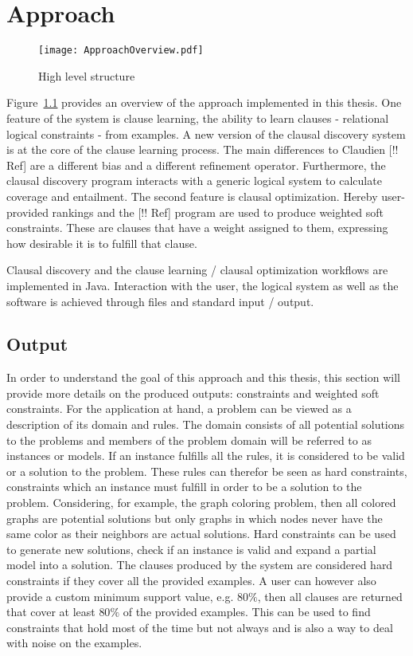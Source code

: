 \chapter{Approach}
\label{cha:meth}

\begin{figure}

	\caption{High level structure}
	\centering
		\texttt{[image: ApproachOverview.pdf]}
	\label{fig:high_level_structure}

\end{figure}

Figure~\ref{fig:high_level_structure} provides an overview of the approach implemented in this thesis. One feature of the system is clause learning, the ability to learn clauses - relational logical constraints - from examples. A new version of the clausal discovery system is at the core of the clause learning process. The main differences to Claudien [!! Ref] are a different bias and a different refinement operator. Furthermore, the clausal discovery program interacts with a generic logical system to calculate coverage and entailment. The second feature is clausal optimization. Hereby user-provided rankings and the \svm{} [!! Ref] program are used to produce weighted soft constraints. These are clauses that have a weight assigned to them, expressing how desirable it is to fulfill that clause.

Clausal discovery and the clause learning / clausal optimization workflows are implemented in Java. Interaction with the user, the logical system as well as the \svm{} software is achieved through files and standard input / output. 

\section{Output}
In order to understand the goal of this approach and this thesis, this section will provide more details on the produced outputs: constraints and weighted soft constraints. For the application at hand, a problem can be viewed as a description of its domain and rules. The domain consists of all potential solutions to the problems and members of the problem domain will be referred to as instances or models. If an instance fulfills all the rules, it is considered to be valid or a solution to the problem. These rules can therefor be seen as hard constraints, constraints which an instance must fulfill in order to be a solution to the problem. Considering, for example, the graph coloring problem, then all colored graphs are potential solutions but only graphs in which nodes never have the same color as their neighbors are actual solutions. Hard constraints can be used to generate new solutions, check if an instance is valid and expand a partial model into a solution. The clauses produced by the system are considered hard constraints if they cover all the provided examples. A user can however also provide a custom minimum support value, e.g. $80\%$, then all clauses are returned that cover at least $80\%$ of the provided examples. This can be used to find constraints that hold most of the time but not always and is also a way to deal with noise on the examples.

